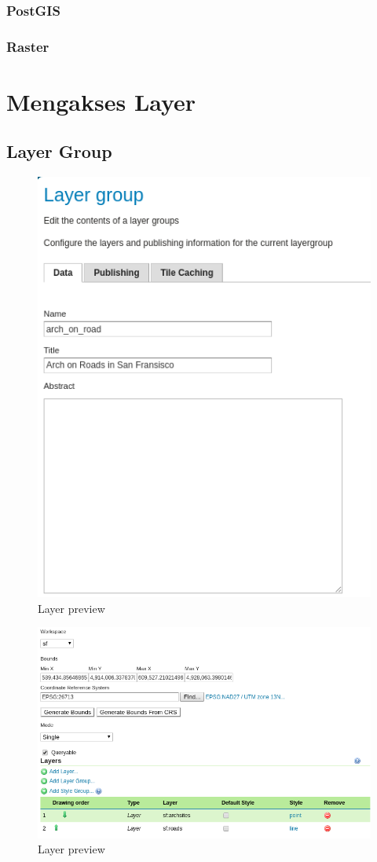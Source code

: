 \documentclass[]{book}
\begin{document}
\hypertarget{postgis}{%
\subsubsection{PostGIS}\label{postgis}}

\hypertarget{raster}{%
\subsubsection{Raster}\label{raster}}

\hypertarget{mengakses-layer}{%
\section{Mengakses Layer}\label{mengakses-layer}}

\hypertarget{layer-group}{%
\subsection{Layer Group}\label{layer-group}}

\begin{figure}

{\centering \includegraphics[width=0.6\linewidth]{images/08/gs23} 

}

\caption{Layer preview}\label{fig:gs23}
\end{figure}

\begin{figure}

{\centering \includegraphics[width=0.6\linewidth]{images/08/gs24} 

}

\caption{Layer preview}\label{fig:gs24}
\end{figure}
\end{document}
